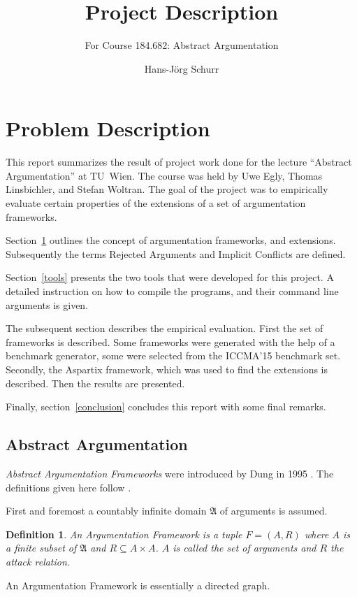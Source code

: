 \documentclass[parskip=half]{scrartcl}
\title{Project Description}
\subtitle{For Course 184.682: Abstract Argumentation}
\author{Hans-Jörg Schurr}
\newtheorem{definition}{Definition}
\begin{document}
\maketitle
\tableofcontents

\section{Problem Description}
\label{problemdesc}
This report summarizes the result of project work done for the lecture
``Abstract Argumentation'' at TU~Wien. The course was held by Uwe Egly,
Thomas Linsbichler, and Stefan Woltran.
The goal of the project
was to empirically evaluate certain properties of the extensions of a set of
argumentation frameworks.

Section~\ref{problemdesc} outlines the concept of argumentation frameworks, and
extensions. Subsequently the terms Rejected Arguments and Implicit Conflicts are
defined.

Section~\ref{tools} presents the two tools that were developed for this project.
A detailed instruction on how to compile the programs, and their command line
arguments is given.

The subsequent section describes the empirical evaluation. First the set of
frameworks is described.  Some frameworks were generated with the help of a
benchmark generator, some were selected from the ICCMA'15 benchmark set.
Secondly, the Aspartix framework, which was used to find the extensions is
described. Then the results are presented.

Finally, section~\ref{conclusion} concludes this report with some final remarks.

\subsection{Abstract Argumentation}
\label{aadef}
\emph{Abstract Argumentation Frameworks} were introduced by Dung in 1995 \cite{dung1995}. The
definitions given here follow \cite{baumann2016}.

First and foremost a countably infinite domain $\mathfrak{A}$ of arguments
is assumed.

\begin{definition}
An \emph{Argumentation Framework}
is a tuple $F = (A,R)$ where $A$ is a finite subset of $\mathfrak{A}$
and $R \subseteq A\times A$.  $A$ is called the set of arguments and $R$ the
attack relation.
\end{definition}
An Argumentation Framework is essentially a directed graph.
\end{document}
